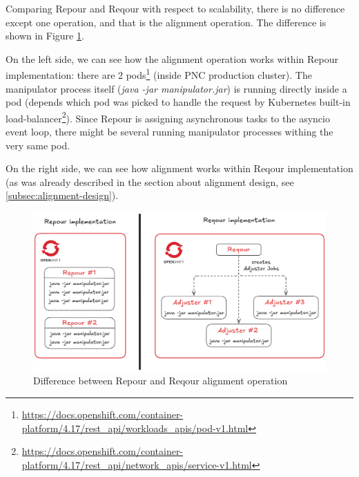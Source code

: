 \documentclass[../main.tex]{subfiles}
\begin{document}
Comparing Repour and Reqour with respect to scalability, there is no difference except one operation, and that is the alignment operation. The difference is shown in Figure \ref{fig:scalability}.

On the left side, we can see how the alignment operation works within Repour implementation: there are 2 pods\footnote{\url{https://docs.openshift.com/container-platform/4.17/rest_api/workloads_apis/pod-v1.html}} (inside PNC production cluster). The manipulator process itself (\textit{java -jar manipulator.jar}) is running directly inside a pod (depends which pod was picked to handle the request by Kubernetes built-in load-balancer\footnote{\url{https://docs.openshift.com/container-platform/4.17/rest_api/network_apis/service-v1.html}}). Since Repour is assigning asynchronous tasks to the asyncio event loop, there might be several running manipulator processes withing the very same pod.

On the right side, we can see how alignment works within Reqour implementation (as was already described in the section about alignment design, see \ref{subsec:alignment-design}).

\begin{figure}
  \begin{center}
    \includegraphics[width=\textwidth]{images/scalability.png}
  \end{center}
  \caption{Difference between Repour and Reqour alignment operation}
  \label{fig:scalability}
\end{figure}
\end{document}
